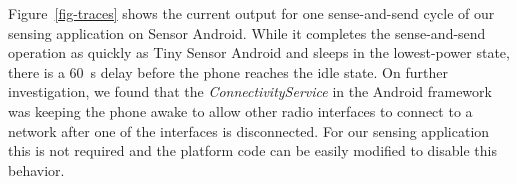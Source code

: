 Figure~\ref{fig-traces} shows the current output for one sense-and-send cycle
of our sensing application on Sensor Android. While it completes the
sense-and-send operation as quickly as Tiny Sensor Android and sleeps in the
lowest-power state, there is a 60~s delay before the phone reaches the idle
state. On further investigation, we found that the
\textit{ConnectivityService} in the Android framework was keeping the phone
awake to allow other radio interfaces to connect to a network after one of
the interfaces is disconnected. For our sensing application this is not
required and the platform code can be easily modified to disable this
behavior.

